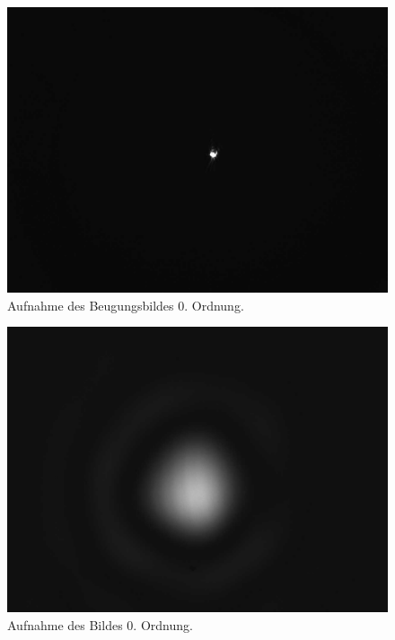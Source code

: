 \documentclass{article}
\begin{document}
\begin{minipage}[t]{.45\textwidth}
\begin{figure}[H]
\includegraphics[scale=0.1]{tm/Beugungsbild_0.jpg}
\caption{Aufnahme des Beugungsbildes 0. Ordnung.}
\label{fig:bbild_0_tm}
\end{figure}
\end{minipage}
\hfill
\noindent
\begin{minipage}[t]{.45\textwidth}
\begin{figure}[H]
\includegraphics[scale=0.1]{tm/Bild_0.jpg}
\caption{Aufnahme des Bildes 0. Ordnung.}
\label{fig:bild_0_tm}
\end{figure}
\end{minipage}
\end{document}
